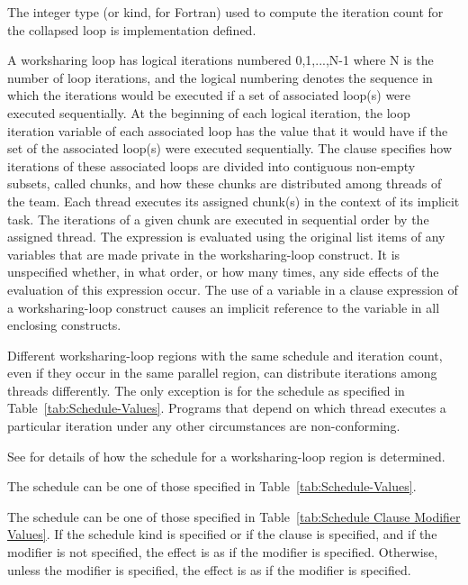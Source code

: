 The integer type (or kind, for Fortran) used to compute the iteration count
for the collapsed loop is implementation defined.

 A worksharing loop has
logical iterations numbered 0,1,...,N-1 where N is the number of loop
iterations, and the logical numbering denotes the sequence in which
the iterations would be executed if a set of associated loop(s) were
executed sequentially.  At the beginning of each logical iteration,
the loop iteration variable of each associated loop has the value that
it would have if the set of the associated loop(s) were executed
sequentially.  The  clause specifies how iterations of
these associated loops are divided into contiguous non-empty subsets,
called chunks, and how these chunks are distributed among threads of
the team. Each thread executes its assigned chunk(s) in the context of
its implicit task.  The iterations of a given chunk are executed in
sequential order by the assigned thread.  The 
expression is evaluated using the original list items of any variables
that are made private in the worksharing-loop construct. It is unspecified
whether, in what order, or how many times, any side effects of the
evaluation of this expression occur. The use of a variable in a
 clause expression of a worksharing-loop construct causes an
implicit reference to the variable in all enclosing constructs.

Different worksharing-loop regions with the same schedule and iteration count, even if
they occur in the same parallel region, can distribute iterations among
threads differently. The only exception is for the  schedule
as specified in Table~\ref{tab:Schedule-Values}. Programs that depend
on which thread executes a particular iteration under any other circumstances
are non-conforming.

See 
for details of how the schedule for a worksharing-loop region is
determined.

The schedule  can be one of those specified in
Table~\ref{tab:Schedule-Values}.

The schedule  can be one of those specified in
Table~\ref{tab:Schedule Clause Modifier Values}. If the
 schedule kind is specified or if the 
clause is specified, and if the  modifier is
not specified, the effect is as if the  modifier
is specified. Otherwise, unless the  modifier is
specified, the effect is as if the  modifier
is specified.

